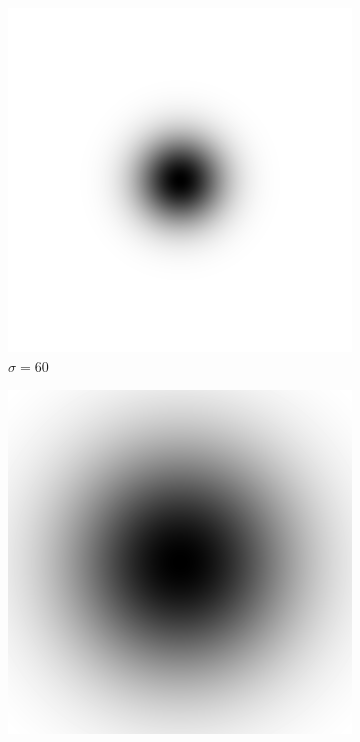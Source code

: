 \documentclass[
	12pt, %
]{style/fphw}
\begin{document}
\begin{figure}[H]
\begin{subfigure}[b]{.3\textwidth}
         \includegraphics[width=\textwidth]{plots2/Q5_2_highpass_filter_60.png}
         \caption{$\sigma=60$}
         \label{Q5_2_high_filter_60}
     \end{subfigure}
     \hfill
     \begin{subfigure}[b]{.3\textwidth}
         \centering
         \includegraphics[width=\textwidth]{plots2/Q5_2_highpass_filter_160.png}

\end{subfigure}
\end{figure}
\end{document}
